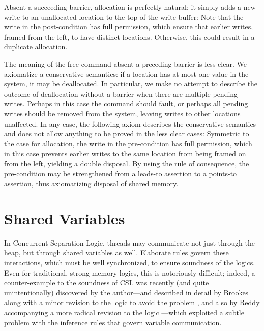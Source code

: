 \documentclass[11pt]{report}         %
\begin{document}
Absent a succeeding barrier, allocation is perfectly natural; it simply adds a new write to an unallocated location to the top of the write buffer:  Note that the write in the post-condition has full permission, which ensure that earlier writes, framed from the left, to have distinct locations. Otherwise, this could result in a duplicate allocation.

The meaning of the free command absent a preceding barrier is less clear. We axiomatize a conservative semantics: if a location has at most one value in the system, it may be deallocated. In particular, we make no attempt to describe the outcome of deallocation without a barrier when there are multiple pending writes. Perhaps in this case the command should fault, or perhaps all pending writes should be removed from the system, leaving writes to other locations unaffected. In any case, the following axiom describes the conservative semantics and does not allow anything to be proved in the less clear cases:  Symmetric to the case for allocation, the write in the pre-condition has full permission, which in this case prevents earlier writes to the same location from being framed on from the left, yielding a double disposal. By using the rule of consequence, the pre-condition may be strengthened from a leads-to assertion to a points-to assertion, thus axiomatizing disposal of shared memory.

\section{Shared Variables}
\label{sec:shared-variables}

In Concurrent Separation Logic, threads may communicate not just through the heap, but through shared variables as well. Elaborate rules govern these interactions, which must be well synchronized, to ensure soundness of the logics. Even for traditional, strong-memory logics, this is notoriously difficult; indeed, a counter-example to the soundness of CSL was recently (and quite unintentionally) discovered by the author---and described in detail by Brookes along with a minor revision to the logic to avoid the problem \cite{Brookes20115}, and also by Reddy accompanying a more radical revision to the logic \cite{DBLP:conf/popl/ReddyR12}---which exploited a subtle problem with the inference rules that govern variable communication. 
\end{document}
